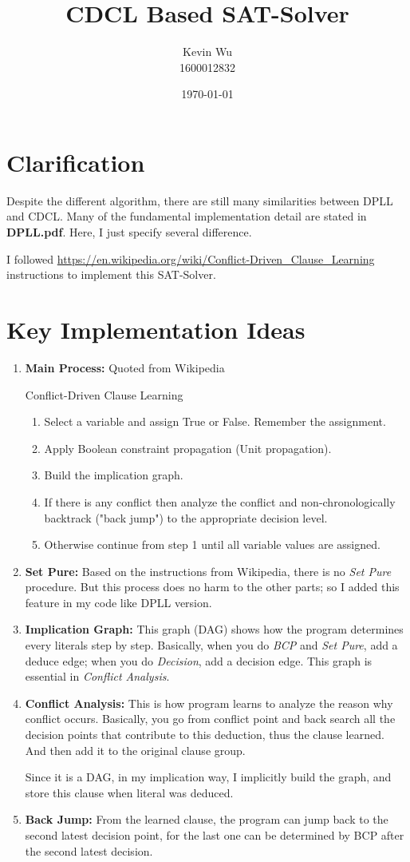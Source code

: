 \documentclass[a4paper,10pt]{article}
\title{CDCL Based SAT-Solver}
\author{Kevin Wu\\1600012832}
\date{\today}
\begin{document}
\maketitle
\section{Clarification}
Despite the different algorithm, there are still many similarities between DPLL and CDCL. Many of the fundamental implementation detail are stated in \textbf{DPLL.pdf}. Here, I just specify several difference.\par
I followed \url{https://en.wikipedia.org/wiki/Conflict-Driven_Clause_Learning} instructions to implement this SAT-Solver.

\section{Key Implementation Ideas}
\begin{enumerate}
\setlength{\itemsep}{.1em}
\item \textbf{Main Process:} Quoted from Wikipedia
\begin{center}
Conflict-Driven Clause Learning
\begin{enumerate}
\small\setlength{\itemsep}{.1em}
\item Select a variable and assign True or False. Remember the assignment.
\item Apply Boolean constraint propagation (Unit propagation).
\item Build the implication graph.
\item If there is any conflict then analyze the conflict and non-chronologically backtrack ("back jump") to the appropriate decision level.
\item Otherwise continue from step 1 until all variable values are assigned.
\end{enumerate}
\end{center}
\item \textbf{Set Pure:} Based on the instructions from Wikipedia, there is no \textit{Set Pure} procedure. But this process does no harm to the other parts; so I added this feature in my code like DPLL version.
\item \textbf{Implication Graph:} This graph (DAG) shows how the program determines every literals step by step. Basically, when you do \textit{BCP} and \textit{Set Pure}, add a deduce edge; when you do \textit{Decision}, add a decision edge. This graph is essential in \textit{Conflict Analysis}.
\item \textbf{Conflict Analysis:} This is how program learns to analyze the reason why conflict occurs. Basically, you go from conflict point and back search all the decision points that contribute to this deduction, thus the clause learned. And then add it to the original clause group.\par
Since it is a DAG, in my implication way, I implicitly build the graph, and store this clause when literal was deduced.
\item \textbf{Back Jump:} From the learned clause, the program can jump back to the second latest decision point, for the last one can be determined by BCP after the second latest decision.
\end{enumerate}
\end{document}

